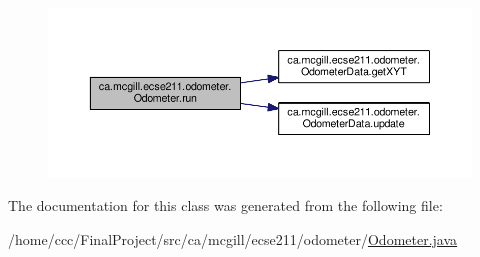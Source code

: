 \nopagebreak
\begin{figure}[H]
\begin{center}
\leavevmode
\includegraphics[width=350pt]{classca_1_1mcgill_1_1ecse211_1_1odometer_1_1_odometer_af0ff4c5121973a8310cf986e25fa0d87_cgraph}
\end{center}
\end{figure}


The documentation for this class was generated from the following file\+:\begin{DoxyCompactItemize}
\item 
/home/ccc/\+Final\+Project/src/ca/mcgill/ecse211/odometer/\hyperlink{_odometer_8java}{Odometer.\+java}\end{DoxyCompactItemize}

